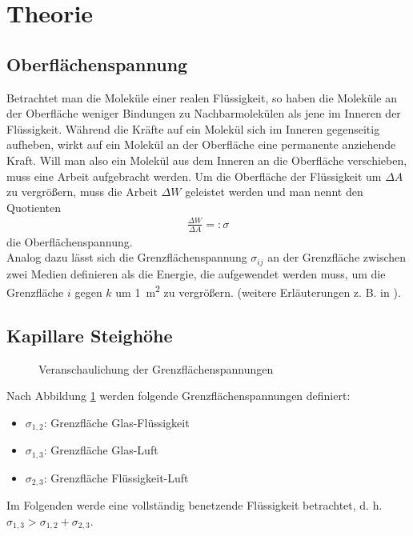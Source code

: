 \section{Theorie}
%
\subsection{Oberflächenspannung}
Betrachtet man die Moleküle einer realen Flüssigkeit, so haben die Moleküle an der Oberfläche weniger Bindungen zu Nachbarmolekülen als jene im Inneren der Flüssigkeit. Während die Kräfte auf ein Molekül sich im Inneren gegenseitig aufheben, wirkt auf ein Molekül an der Oberfläche eine permanente anziehende Kraft. Will man also ein Molekül aus dem Inneren an die Oberfläche verschieben, muss eine Arbeit aufgebracht werden.  Um die Oberfläche der Flüssigkeit um $\Delta A$ zu vergrößern, muss die Arbeit $\Delta W$ geleistet werden und man nennt den Quotienten
%
\begin{align}
	\frac{\Delta W}{\Delta A}=:\sigma
\end{align}
%
die Oberflächenspannung. \cite{Demtroeder:2008:Book}\\
%
Analog dazu lässt sich die Grenzflächenspannung $\sigma_{ij}$ an der Grenzfläche zwischen zwei Medien definieren als die Energie, die aufgewendet werden muss, um die Grenzfläche $i$ gegen $k$ um \SI{1}{\m\squared} zu vergrößern. (weitere Erläuterungen z. B. in \cite{Demtroeder:2008:Book}).
\subsection{Kapillare Steighöhe}
%
\begin{figure}[H]
\centering
\resizebox{0.5\textwidth}{!}{}
\caption{Veranschaulichung der Grenzflächenspannungen}
\label{img:grenzflaechen}
\end{figure}
%
Nach Abbildung \ref{img:grenzflaechen} werden folgende Grenzflächenspannungen definiert:
%
\begin{itemize}
	\item $\sigma_{1,2}$: Grenzfläche Glas-Flüssigkeit
	\item $\sigma_{1,3}$: Grenzfläche Glas-Luft
	\item $\sigma_{2,3}$: Grenzfläche Flüssigkeit-Luft
\end{itemize}
%
Im Folgenden werde eine vollständig benetzende Flüssigkeit betrachtet, d. h. $\sigma_{1,3}>\sigma_{1,2}+\sigma_{2,3}$.
%
